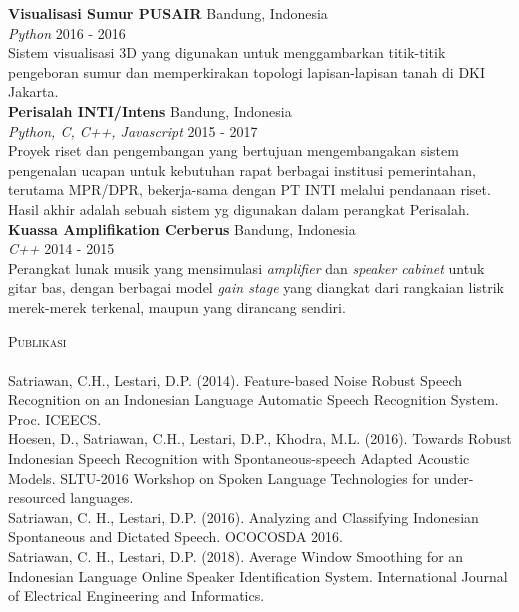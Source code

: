 \documentclass[a4paper]{article}
\newcommand{\lineunder} {
    \vspace*{-8pt} \\
    \hspace*{-18pt} \hrulefill \\
}
\newcommand{\header} [1] {
    {\hspace*{-18pt}\vspace*{6pt} \textsc{#1}}
    \vspace*{-6pt} \lineunder
}
\begin{document}
{\textbf{Visualisasi Sumur PUSAIR}}  \hfill Bandung, Indonesia\\
{\sl Python} \hfill 2016 - 2016\\
\vspace*{1mm}
Sistem visualisasi 3D yang digunakan untuk menggambarkan titik-titik pengeboran
sumur dan memperkirakan topologi lapisan-lapisan tanah di DKI Jakarta.\\
\vspace*{3mm}
{\textbf{Perisalah INTI/Intens}}  \hfill Bandung, Indonesia\\
{\sl Python, C, C++, Javascript} \hfill 2015 - 2017\\
\vspace*{1mm}
Proyek riset dan pengembangan yang bertujuan mengembangakan sistem pengenalan
ucapan untuk kebutuhan rapat berbagai institusi pemerintahan, terutama MPR/DPR,
bekerja-sama dengan PT INTI melalui pendanaan riset. Hasil akhir adalah sebuah
sistem yg digunakan dalam perangkat Perisalah.\\
\vspace*{3mm}
{\textbf{Kuassa Amplifikation Cerberus}}  \hfill Bandung, Indonesia\\
{\sl C++} \hfill 2014 - 2015\\
\vspace*{1mm}
Perangkat lunak musik yang mensimulasi \textit{amplifier} dan \textit{speaker
cabinet} untuk gitar bas, dengan berbagai model \textit{gain stage} yang
diangkat dari rangkaian listrik merek-merek terkenal, maupun yang dirancang
sendiri. \\
\vspace*{3mm}

\header{Publikasi}
\vspace{2mm}
Satriawan, C.H., Lestari, D.P. (2014). Feature-based Noise Robust Speech Recognition on an Indonesian Language Automatic Speech Recognition System.
Proc. ICEECS.\\
\vspace*{3mm}
Hoesen, D., Satriawan, C.H., Lestari, D.P., Khodra, M.L. (2016). Towards Robust Indonesian Speech Recognition with Spontaneous-speech Adapted Acoustic Models.
SLTU-2016 Workshop on Spoken Language Technologies for under-resourced
languages.\\
\vspace*{3mm}
Satriawan, C. H., Lestari, D.P. (2016). Analyzing and Classifying Indonesian Spontaneous and Dictated Speech. OCOCOSDA 2016.\\
\vspace*{3mm}
Satriawan, C. H., Lestari, D.P. (2018). Average Window Smoothing for an
Indonesian Language Online Speaker Identification System.
International Journal of Electrical Engineering and Informatics.\\

\ 
\end{document}
